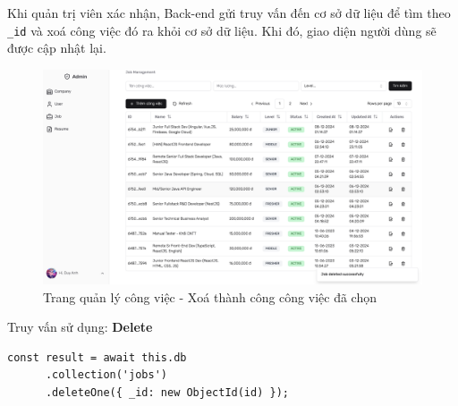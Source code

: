 Khi quản trị viên xác nhận, Back-end gửi truy vấn đến cơ sở dữ liệu để tìm theo \texttt{\_id} và xoá công việc đó ra khỏi cơ sở dữ liệu. Khi đó, giao diện người dùng sẽ được cập nhật lại.\\

\begin{figure}[H]
    \centering
    \includegraphics[width=\linewidth]{DBMS-Application/Images/delete-job-successfully.png}
    \caption{Trang quản lý công việc - Xoá thành công công việc đã chọn}
    \label{fig:enter-label}
\end{figure}

Truy vấn sử dụng: \textbf{Delete}

\begin{lstlisting}
const result = await this.db
      .collection('jobs')
      .deleteOne({ _id: new ObjectId(id) });
\end{lstlisting}